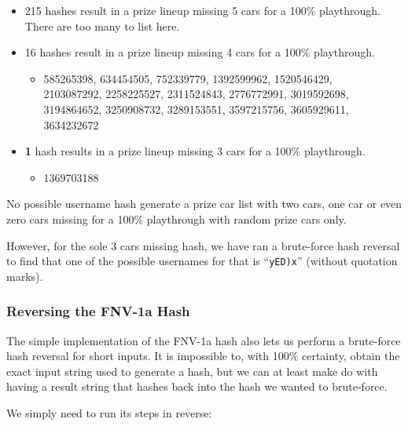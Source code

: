 \documentclass[14pt,a4paper,notitlepage]{extarticle}
\begin{document}
                \begin{itemize}
                    \item 215 hashes result in a prize lineup missing 5 cars for a 100\% playthrough.
                          There are too many to list here.
                    \item 16 hashes result in a prize lineup missing 4 cars for a 100\% playthrough.
                    \begin{itemize}
                        \item 585265398, 634454505, 752339779, 1392599962, 1520546429,\\2103087292, 2258225527, 2311524843, 2776772991, 3019592698,\\3194864652, 3250908732, 3289153551, 3597215756, 3605929611,\\3634232672
                    \end{itemize}
                    \item \textbf{1} hash results in a prize lineup missing 3 cars for a 100\% playthrough.
                    \begin{itemize}
                        \item 1369703188
                    \end{itemize}
                \end{itemize}

                No possible username hash generate a prize car list with two cars, one car
                or even zero cars missing for a 100\% playthrough with random prize cars only.

                However, for the sole 3 cars missing hash, we have ran a brute-force hash reversal
                to find that one of the possible usernames for that is ``\texttt{yED)x}'' (without quotation
                marks).

            \subsubsection*{Reversing the FNV-1a Hash}
                The simple implementation of the FNV-1a hash also lets us perform a brute-force hash
                reversal for short inputs. It is impossible to, with 100\% certainty, obtain the exact
                input string used to generate a hash, but we can at least make do with having a result
                string that hashes back into the hash we wanted to brute-force.

                We simply need to run its steps in reverse:
\end{document}

